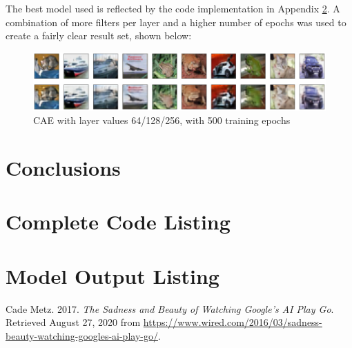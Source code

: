 \documentclass{article}
\begin{document}
\par The best model used is reflected by the code implementation in Appendix \ref{codelist}. A combination of more filters per layer and a higher number of epochs was used to create a fairly clear result set, shown below:
\begin{figure}[H]
    \centering
    \includegraphics[width=5in]{csci-8110/hw-1/hw1-images/64-128-256-500.png}
    \caption{CAE with layer values 64/128/256, with 500 training epochs}
    \label{fig:final}
\end{figure}

\section{Conclusions}
\newpage
\begin{appendices}
\section{Complete Code Listing} \label{codelist}

\newpage
\section{Model Output Listing} \label{modelouts}
\end{appendices}

\begin{thebibliography}{9}
  Cade Metz. 2017.
  \textit{The Sadness and Beauty of Watching Google's AI Play Go}. 
  Retrieved August 27, 2020 from \url{https://www.wired.com/2016/03/sadness-beauty-watching-googles-ai-play-go/}.
  
  \end{thebibliography}
\end{document}
